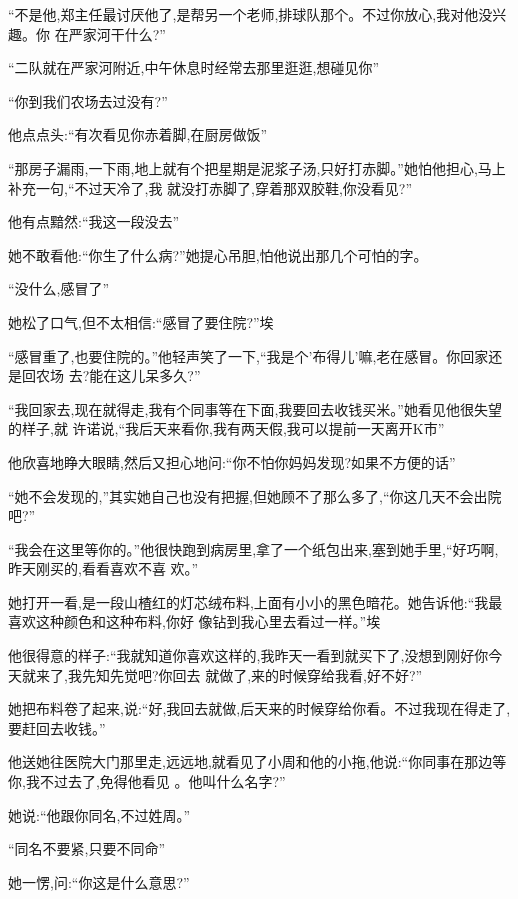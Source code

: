 ﻿\documentclass[12pt]{article}
\begin{document}
``不是他,郑主任最讨厌他了,是帮另一个老师,排球队\myrule 那个。不过你放心,我对他\myrule 没兴趣。你
\myrule 在严家河\myrule 干什么?''

``二队就在严家河附近,中午休息时经常去那里逛逛,想\myrule 碰见你\myrule ''

``你\myrule 到我们农场去过没有?''

他点点头:``有次看见你赤着脚,在厨房做饭\myrule ''

``那房子漏雨,一下雨,地上就有个把星期是泥浆子汤,只好打赤脚。''她怕他担心,马上补充一句,``不过天冷了,我
就没打赤脚了,穿着那双胶鞋\myrule ,你没看见?''

他有点黯然:``我这一段\myrule 没去\myrule ''


她不敢看他:``你\myrule 生了什么病?''她提心吊胆,怕他说出那几个可怕的字。

``没什么,感冒了\myrule ''

她松了口气,但不太相信:``感冒了要住院?''埃

``感冒重了,也要住院的。''他轻声笑了一下,``我是个'布得儿'嘛,老在感冒。你\myrule 回家还是\myrule 回农场
去?能在这儿呆\myrule 多久?''

``我回家去,现在就得走,我\myrule 有个同事等在下面,我\myrule 要回去收钱买米。''她看见他很失望的样子,就
许诺说,``我后天来看你,我有两天假,我可以提前一天离开K市\myrule ''

他欣喜地睁大眼睛,然后又担心地问:``你\myrule 不怕你妈妈发现?如果不方便的话\myrule ''

``她不会发现的,''其实她自己也没有把握,但她顾不了那么多了,``你\myrule 这几天不会\myrule 出院吧?''

``我会在这里等你的。''他很快跑到病房里,拿了一个纸包出来,塞到她手里,``好巧啊,昨天刚买的,看看喜欢不喜
欢。''

她打开一看,是一段山楂红的灯芯绒布料,上面有小小的黑色暗花。她告诉他:``我最喜欢这种颜色和这种布料,你好
像钻到我心里去看过一样。''埃

他很得意的样子:``我就知道你喜欢这样的,我昨天一看到就买下了,没想到刚好你今天就来了,我先知先觉吧?你回去
就做了,来的时候穿给我看,好不好?''

她把布料卷了起来,说:``好,我回去就做,后天来的时候穿给你看。不过我现在得走了,要赶回去收钱。''

他送她往医院大门那里走,远远地,就看见了小周和他的小拖,他说:``你同事在那边等你,我不过去了,免得他看见
\myrule 。他叫什么名字?''

她说:``他跟你同名,不过姓周。''

``同名不要紧,只要不同命\myrule ''

她一愣,问:``你这是\myrule 什么意思?''
\end{document}
